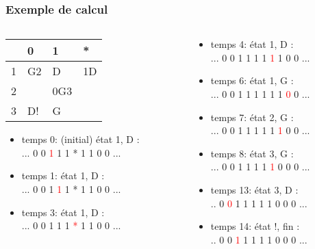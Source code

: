 \begin{frame}
  \frametitle{Exemple de calcul}
\begin{columns}
  \begin{column}{6cm}
\begin{center}  
\renewcommand{\arraystretch}{1.5}
\begin{tabular}{|l|l|l|l|} \hline
  & 0  & 1   & *  \\ \hline
1 & G2 & D   & 1D \\ \hline
2 &    & 0G3 &    \\ \hline
3 & D! & G   &    \\ \hline
\end{tabular} 
\end{center}
\begin{itemize}
  \item temps 0: (initial) état 1, D :\\ ... 0 0 \textcolor{red}{1} 1 1 * 1 1 0 0 ...
  \item temps 1:  état 1, D :\\ ... 0 0 1 \textcolor{red}{1} 1 * 1 1 0 0 ...
  \item temps 3:  état 1, D :\\ ... 0 0 1 1 1 \textcolor{red}{*} 1 1 0 0 ...
\end{itemize}

  \end{column}

  \begin{column}{6cm}
\begin{itemize}
  \item temps 4:  état 1, D :\\ ... 0 0 1 1 1 1 \textcolor{red}{1} 1 0 0 ...
  \item temps 6:  état 1, G :\\ ... 0 0 1 1 1 1 1 1 \textcolor{red}{0} 0  ...
  \item temps 7:  état 2, G :\\ ... 0 0 1 1 1 1 1 \textcolor{red}{1} 0 0  ...
  \item temps 8:  état 3, G :\\ ... 0 0 1 1 1 1 \textcolor{red}{1} 0 0 0  ...
  \item temps 13:  état 3, D :\\ .. 0 \textcolor{red}{0} 1 1 1 1 1 0 0 0  ...
  \item temps 14:  état !, fin :\\ .. 0 0 \textcolor{red}{1} 1 1 1 1 0 0 0  ...
\end{itemize}
  \end{column}
\end{columns}
\end{frame}

